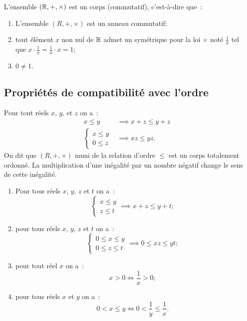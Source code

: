 \begin{prop}
  L'ensemble \((\mathbb{R},+,\times)\) est un corps (commutatif), c'est-à-dire que~:
  \begin{enumerate}
  \item L'ensemble \((R,+,\times)\) est un anneau commutatif;
  \item tout élément \(x\) non nul de \(\mathbb{R}\) admet un symétrique pour la loi \(\times\) noté \(\frac{1}{x}\) tel que \(x\cdot \frac{1}{x}=\frac{1}{x}\cdot x=1\);
  \item \(0\neq 1\).
  \end{enumerate}
\end{prop}

\subsection{Propriétés de compatibilité avec l'ordre}

\begin{prop}
  Pour tout réels \(x\), \(y\), et \(z\) on a~:
  \begin{align}
    x\leqslant y &\implies x+z\leqslant y+z \\
    \begin{cases} x\leqslant y \\ 0\leqslant z \end{cases} &\implies xz \leqslant yz.
  \end{align}
On dit que \((R,+,\times)\) muni de la relation d'ordre \(\leqslant\) est un corps totalement ordonné. La multiplication d'une inégalité par un nombre négatif change le sens de cette inégalité.
\end{prop}
\begin{enumerate}
\item Pour tous réels \(x\), \(y\), \(z\) et \(t\) on a~:
  \begin{equation}
    \begin{cases}x\leqslant y \\ z \leqslant t \end{cases} \implies x+z\leqslant y+t;
  \end{equation}
\item pour tous réels \(x\), \(y\), \(z\) et \(t\) on a~:
  \begin{equation}
    \begin{cases}0\leqslant x\leqslant y \\ 0 \leqslant z \leqslant t \end{cases} \implies 0\leqslant xz \leqslant yt;
  \end{equation}
\item pour tout réel \(x\) on a~:
  \begin{equation}
    x>0 \iff \frac{1}{x}>0;
  \end{equation}
\item pour tous réels \(x\) et \(y\) on a~:
  \begin{equation}
    0<x\leqslant y \iff 0<\frac{1}{y}\leqslant \frac{1}{x}.
  \end{equation}
\end{enumerate}

